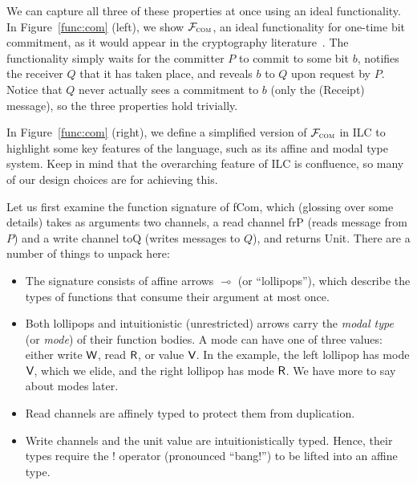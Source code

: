 We can capture all three of these
properties at once using an ideal functionality. In Figure~\ref{func:com}
(left), we show $\mathcal{{F}}_{\textsc{com}}$, an ideal functionality for one-time bit
commitment, as it would appear in the cryptography
literature~\cite{canetti2001commitments}. The functionality simply waits for the
committer $P$ to commit to some bit $b$, notifies the receiver $Q$ that it has
taken place, and reveals $b$ to $Q$ upon request by $P$. Notice that $Q$ never
actually sees a commitment to $b$ (only the (\textsf{Receipt}) message), so the
three properties hold trivially.

In Figure~\ref{func:com} (right), we define a simplified version of
$\mathcal{{F}}_{\textsc{com}}$ in ILC to highlight some key features of the language,
such as its affine and modal type system. Keep in mind that the overarching
feature of ILC is confluence, so many of our design choices are for achieving
this.\smallskip

Let us first examine the function signature of \textsf{fCom}, which (glossing
over some details) takes as arguments two channels, a read channel \textsf{frP}
(reads message from $P$) and a write channel \textsf{toQ} (writes messages to
$Q$), and returns \textsf{Unit}. There are a number of things to unpack here:

\begin{itemize}[leftmargin=*]
  \item The signature consists of affine arrows $\multimap$ (or ``lollipops''), which
    describe the types of functions that consume their argument at most once.
  \item Both lollipops and intuitionistic (unrestricted) arrows carry the
    \emph{modal type} (or \emph{mode}) of their function bodies. A mode can have
    one of three values: either write $\textsf{W}$, read $\textsf{R}$, or value $\textsf{V}$.  In the
    example, the left lollipop has mode $\textsf{V}$, which we elide, and the right
    lollipop has mode $\textsf{R}$. We have more to say about modes later.
  \item Read channels are affinely typed to protect them from duplication.
  \item Write channels and the unit value are intuitionistically typed. Hence,
    their types require the ! operator (pronounced ``bang!'') to be lifted into
    an affine type.
\end{itemize}

